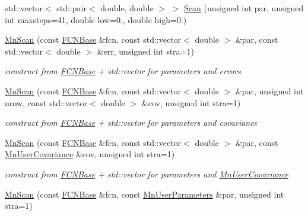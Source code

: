 \begin{DoxyCompactItemize}
\item 
std\+::vector$<$ std\+::pair$<$ double, double $>$ $>$ \mbox{\hyperlink{classROOT_1_1Minuit2_1_1MnScan_aaad559ec656a90df6e3283885ff2e7ca}{Scan}} (unsigned int par, unsigned int maxsteps=41, double low=0., double high=0.)
\item 
\mbox{\hyperlink{classROOT_1_1Minuit2_1_1MnScan_a377822c78ab78d995bc0a710dbc0c426}{Mn\+Scan}} (const \mbox{\hyperlink{classROOT_1_1Minuit2_1_1FCNBase}{F\+C\+N\+Base}} \&fcn, const std\+::vector$<$ double $>$ \&par, const std\+::vector$<$ double $>$ \&err, unsigned int stra=1)
\begin{DoxyCompactList}\small\item\em construct from \mbox{\hyperlink{classROOT_1_1Minuit2_1_1FCNBase}{F\+C\+N\+Base}} + std\+::vector for parameters and errors \end{DoxyCompactList}\item 
\mbox{\hyperlink{classROOT_1_1Minuit2_1_1MnScan_a293bc22ed5bd5755f4c1d7256c1936ab}{Mn\+Scan}} (const \mbox{\hyperlink{classROOT_1_1Minuit2_1_1FCNBase}{F\+C\+N\+Base}} \&fcn, const std\+::vector$<$ double $>$ \&par, unsigned int nrow, const std\+::vector$<$ double $>$ \&cov, unsigned int stra=1)
\begin{DoxyCompactList}\small\item\em construct from \mbox{\hyperlink{classROOT_1_1Minuit2_1_1FCNBase}{F\+C\+N\+Base}} + std\+::vector for parameters and covariance \end{DoxyCompactList}\item 
\mbox{\hyperlink{classROOT_1_1Minuit2_1_1MnScan_a289c4259abdbd4886dddf51d30531870}{Mn\+Scan}} (const \mbox{\hyperlink{classROOT_1_1Minuit2_1_1FCNBase}{F\+C\+N\+Base}} \&fcn, const std\+::vector$<$ double $>$ \&par, const \mbox{\hyperlink{classROOT_1_1Minuit2_1_1MnUserCovariance}{Mn\+User\+Covariance}} \&cov, unsigned int stra=1)
\begin{DoxyCompactList}\small\item\em construct from \mbox{\hyperlink{classROOT_1_1Minuit2_1_1FCNBase}{F\+C\+N\+Base}} + std\+::vector for parameters and \mbox{\hyperlink{classROOT_1_1Minuit2_1_1MnUserCovariance}{Mn\+User\+Covariance}} \end{DoxyCompactList}\item 
\mbox{\hyperlink{classROOT_1_1Minuit2_1_1MnScan_a93a7093c7881feddd2f7e4541eb8fad9}{Mn\+Scan}} (const \mbox{\hyperlink{classROOT_1_1Minuit2_1_1FCNBase}{F\+C\+N\+Base}} \&fcn, const \mbox{\hyperlink{classROOT_1_1Minuit2_1_1MnUserParameters}{Mn\+User\+Parameters}} \&par, unsigned int stra=1)

\end{DoxyCompactItemize}
